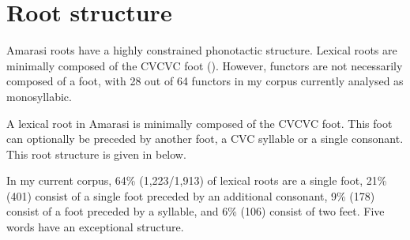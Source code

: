\section{Root structure}\label{sec:RooStr}
Amarasi roots have a highly constrained phonotactic structure.
Lexical roots are minimally composed of the CVCVC foot ().
However, functors are not necessarily composed of a foot,
with 28 out of 64 functors in my corpus
currently analysed as monosyllabic.

A lexical root in Amarasi is minimally composed of the CVCVC foot.
This foot can optionally be preceded by another foot,
a CVC syllable or a single consonant.
This root structure is given in  below.

\begin{exe}
	\label{ex:Root->SFt}
\end{exe}

In my current corpus, 64{\%} (1,223/1,913) of lexical roots are a single foot,
21{\%} (401) consist of a single foot preceded by an additional consonant,
9{\%} (178) consist of a foot preceded by a syllable, and 6{\%} (106) consist of two feet.
Five words have an exceptional structure.